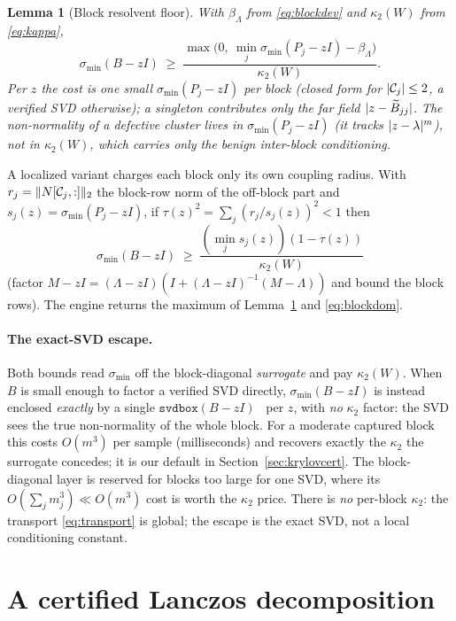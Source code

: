 \documentclass[11pt]{article}
\newtheorem{lemma}[theorem]{Lemma}
\newcommand{\sigmin}{\sigma_{\min}}
\DeclarePairedDelimiter{\norm}{\lVert}{\rVert}
\DeclarePairedDelimiter{\abs}{\lvert}{\rvert}
\newcommand{\svdbox}{\texttt{svdbox}}
\begin{document}
\begin{lemma}[Block resolvent floor]\label{lem:blockres}
With $\beta_\Lambda$ from \eqref{eq:blockdev} and $\kappa_2(W)$ from \eqref{eq:kappa},
\[
  \sigmin(B-zI)\;\ge\;\frac{\max\!\big(0,\ \min_j\sigmin(P_j-zI)-\beta_\Lambda\big)}{\kappa_2(W)}.
\]
Per $z$ the cost is one small $\sigmin(P_j-zI)$ per block (closed form for $\abs{\mathcal C_j}\le2$,
a verified SVD otherwise); a singleton contributes only the far field $\abs{z-\widetilde B_{jj}}$.
The non-normality of a defective cluster lives in $\sigmin(P_j-zI)$ (it tracks $\abs{z-\lambda}^m$),
\emph{not} in $\kappa_2(W)$, which carries only the benign inter-block conditioning.
\end{lemma}

A localized variant charges each block only its own coupling radius. With
$r_j=\norm{N[\mathcal C_j,:]}_2$ the block-row norm of the off-block part and
$s_j(z)=\sigmin(P_j-zI)$, if $\tau(z)^2=\sum_j (r_j/s_j(z))^2<1$ then
\begin{equation}\label{eq:blockdom}
  \sigmin(B-zI)\;\ge\;\frac{(\min_j s_j(z))(1-\tau(z))}{\kappa_2(W)}
\end{equation}
(factor $M-zI=(\Lambda-zI)(I+(\Lambda-zI)^{-1}(M-\Lambda))$ and bound the block rows). The engine
returns the maximum of Lemma~\ref{lem:blockres} and \eqref{eq:blockdom}.

\paragraph{The exact-SVD escape.} Both bounds read $\sigmin$ off the block-diagonal \emph{surrogate}
and pay $\kappa_2(W)$. When $B$ is small enough to factor a verified SVD directly, $\sigmin(B-zI)$ is instead enclosed \emph{exactly} by a single $\svdbox(B-zI)$~\cite{Miyajima2014SV} per $z$, with \emph{no} $\kappa_2$
factor: the SVD sees the true non-normality of the whole block. For a moderate captured block this
costs $O(m^3)$ per sample (milliseconds) and recovers exactly the $\kappa_2$ the surrogate concedes;
it is our default in Section~\ref{sec:krylovcert}. The block-diagonal layer is reserved for blocks too
large for one SVD, where its $O(\sum_j m_j^3)\ll O(m^3)$ cost is worth the $\kappa_2$ price. There is
\emph{no} per-block $\kappa_2$: the transport \eqref{eq:transport} is global; the escape is the exact
SVD, not a local conditioning constant.

\section{A certified Lanczos decomposition}\label{sec:lanczos}
\end{document}
